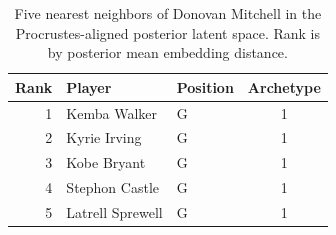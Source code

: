 \begin{table}[htbp]
  \centering\small
  \begin{tabular}{rllc}
    \toprule
    Rank & Player & Position & Archetype \\
    \midrule
    1 & Kemba Walker & G & 1 \\
    2 & Kyrie Irving & G & 1 \\
    3 & Kobe Bryant & G & 1 \\
    4 & Stephon Castle & G & 1 \\
    5 & Latrell Sprewell & G & 1 \\
    \bottomrule
  \end{tabular}
  \caption{Five nearest neighbors of Donovan Mitchell in the Procrustes-aligned posterior latent space. Rank is by posterior mean embedding distance.}
  \label{tab:Donovan_Mitchell_neighbors}
\end{table}

